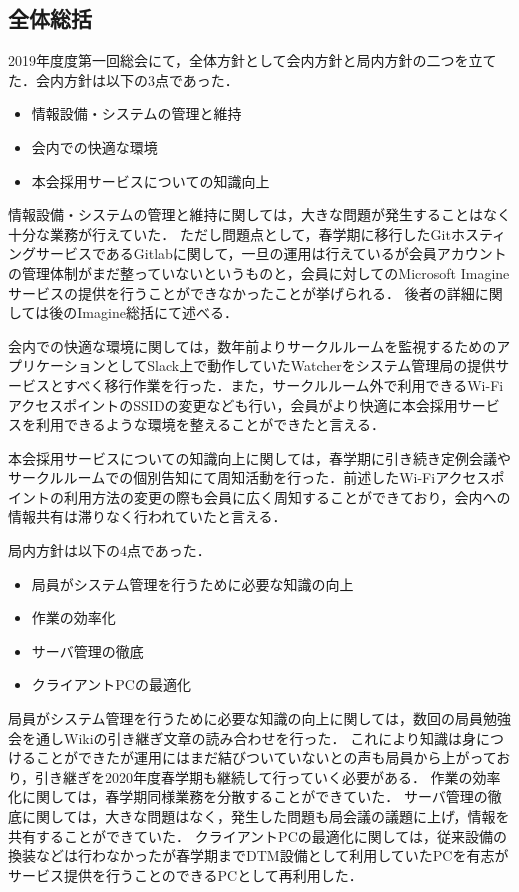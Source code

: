 \subsection*{全体総括}


2019年度度第一回総会にて，全体方針として会内方針と局内方針の二つを立てた．会内方針は以下の3点であった．
\begin{itemize}
  \item 情報設備・システムの管理と維持
  \item 会内での快適な環境
  \item 本会採用サービスについての知識向上
\end{itemize}

情報設備・システムの管理と維持に関しては，大きな問題が発生することはなく十分な業務が行えていた．
ただし問題点として，春学期に移行したGitホスティングサービスであるGitlabに関して，一旦の運用は行えているが会員アカウントの管理体制がまだ整っていないというものと，会員に対してのMicrosoft Imagineサービスの提供を行うことができなかったことが挙げられる．
後者の詳細に関しては後のImagine総括にて述べる．

会内での快適な環境に関しては，数年前よりサークルルームを監視するためのアプリケーションとしてSlack上で動作していたWatcherをシステム管理局の提供サービスとすべく移行作業を行った．また，サークルルーム外で利用できるWi-FiアクセスポイントのSSIDの変更なども行い，会員がより快適に本会採用サービスを利用できるような環境を整えることができたと言える．

本会採用サービスについての知識向上に関しては，春学期に引き続き定例会議やサークルルームでの個別告知にて周知活動を行った．前述したWi-Fiアクセスポイントの利用方法の変更の際も会員に広く周知することができており，会内への情報共有は滞りなく行われていたと言える．

局内方針は以下の4点であった．
\begin{itemize}
  \item 局員がシステム管理を行うために必要な知識の向上
  \item 作業の効率化
  \item サーバ管理の徹底
  \item クライアントPCの最適化
\end{itemize}

局員がシステム管理を行うために必要な知識の向上に関しては，数回の局員勉強会を通しWikiの引き継ぎ文章の読み合わせを行った．
これにより知識は身につけることができたが運用にはまだ結びついていないとの声も局員から上がっており，引き継ぎを2020年度春学期も継続して行っていく必要がある．
作業の効率化に関しては，春学期同様業務を分散することができていた．
サーバ管理の徹底に関しては，大きな問題はなく，発生した問題も局会議の議題に上げ，情報を共有することができていた．
クライアントPCの最適化に関しては，従来設備の換装などは行わなかったが春学期までDTM設備として利用していたPCを有志がサービス提供を行うことのできるPCとして再利用した．
